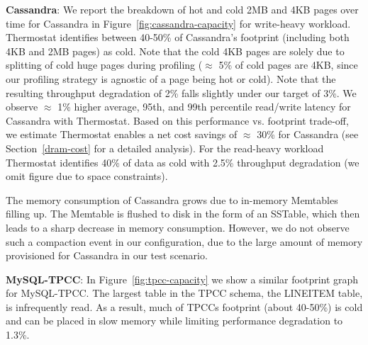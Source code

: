 \textbf{Cassandra}:
We report the breakdown of hot and cold 2MB and 4KB pages over time for 
Cassandra in Figure~\ref{fig:cassandra-capacity} for write-heavy workload. 
Thermostat identifies between 40-50\% of Cassandra's footprint
(including both 4KB and 2MB pages) as cold. Note that the cold 4KB pages are
solely due to splitting of cold huge pages during profiling ($\approx$ 5\% of
cold pages are 4KB, since our profiling strategy is agnostic of a page being hot
or cold).
Note that the resulting throughput degradation of 2\% falls slightly under our 
target of 3\%. We observe $\approx$ 1\% higher average, 95th, and 99th percentile read/write
latency for Cassandra with Thermostat.
Based on this performance vs. footprint trade-off, we estimate Thermostat 
enables a net cost savings of $\approx$ 30\% for Cassandra (see
Section~\ref{dram-cost} for a detailed analysis). For the read-heavy workload
Thermostat identifies 40\% of data as cold with 2.5\% throughput degradation (we
omit figure due to space constraints).

The memory consumption of Cassandra grows due to in-memory Memtables filling up.
The Memtable is flushed to disk in the form of an SSTable, which then leads to a
sharp decrease in memory consumption. However, we do not observe such a
compaction event in our configuration, due to the large amount of memory
provisioned for Cassandra in our test scenario.


\textbf{MySQL-TPCC}:
In Figure~\ref{fig:tpcc-capacity} we show a similar footprint graph for MySQL-TPCC. 
The largest table
in the TPCC schema, the LINEITEM table, is infrequently read.  As a result, much
of TPCCs footprint (about 40-50\%) is cold and can be placed in slow memory while
limiting performance degradation to 1.3\%.

